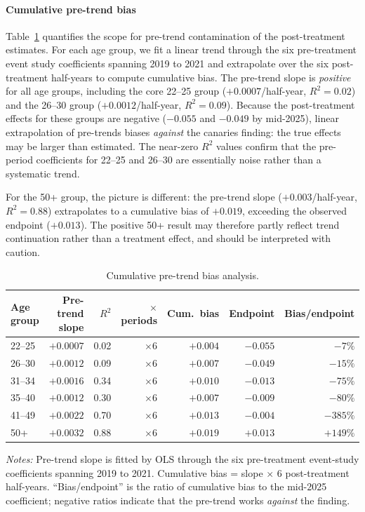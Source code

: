 \documentclass[preprint,12pt,authoryear]{elsarticle}
\begin{document}
\paragraph{Cumulative pre-trend bias}
Table~\ref{tab:pretrend_bias} quantifies the scope for pre-trend contamination of the post-treatment estimates. For each age group, we fit a linear trend through the six pre-treatment event study coefficients spanning 2019 to 2021 and extrapolate over the six post-treatment half-years to compute cumulative bias. The pre-trend slope is \emph{positive} for all age groups, including the core 22--25 group ($+0.0007$/half-year, $R^2 = 0.02$) and the 26--30 group ($+0.0012$/half-year, $R^2 = 0.09$). Because the post-treatment effects for these groups are negative ($-0.055$ and $-0.049$ by mid-2025), linear extrapolation of pre-trends biases \emph{against} the canaries finding: the true effects may be larger than estimated. The near-zero $R^2$ values confirm that the pre-period coefficients for 22--25 and 26--30 are essentially noise rather than a systematic trend.

For the 50+ group, the picture is different: the pre-trend slope ($+0.003$/half-year, $R^2 = 0.88$) extrapolates to a cumulative bias of $+0.019$, exceeding the observed endpoint ($+0.013$). The positive 50+ result may therefore partly reflect trend continuation rather than a treatment effect, and should be interpreted with caution.

\begin{table}[htbp]
\centering
\caption{Cumulative pre-trend bias analysis.}
\label{tab:pretrend_bias}
\footnotesize
\begin{tabular}{@{}lrrrrrr@{}}
\toprule
Age group & Pre-trend slope & $R^2$ & $\times$ periods & Cum.\ bias & Endpoint & Bias/endpoint \\
\midrule
22--25 & $+0.0007$ & 0.02 & $\times 6$ & $+0.004$ & $-0.055$ & $-7\%$ \\
26--30 & $+0.0012$ & 0.09 & $\times 6$ & $+0.007$ & $-0.049$ & $-15\%$ \\
31--34 & $+0.0016$ & 0.34 & $\times 6$ & $+0.010$ & $-0.013$ & $-75\%$ \\
35--40 & $+0.0012$ & 0.30 & $\times 6$ & $+0.007$ & $-0.009$ & $-80\%$ \\
41--49 & $+0.0022$ & 0.70 & $\times 6$ & $+0.013$ & $-0.004$ & $-385\%$ \\
50+ & $+0.0032$ & 0.88 & $\times 6$ & $+0.019$ & $+0.013$ & $+149\%$ \\
\bottomrule
\end{tabular}
\par\medskip
\noindent\parbox{\linewidth}{\raggedright\scriptsize \emph{Notes:} Pre-trend slope is fitted by OLS through the six pre-treatment event-study coefficients spanning 2019 to 2021. Cumulative bias = slope $\times$ 6 post-treatment half-years. ``Bias/endpoint'' is the ratio of cumulative bias to the mid-2025 coefficient; negative ratios indicate that the pre-trend works \emph{against} the finding.}

\end{table}
\end{document}
